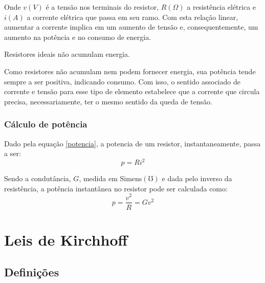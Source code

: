 \documentclass[12pt,fleqn]{book} %
\begin{document}
     Onde $v (V)$ é a tensão nos terminais do resistor, $ R(\Omega)$ a resistência elétrica e $i (A)$ a corrente elétrica que passa em seu ramo. Com esta relação linear, aumentar a corrente implica em um aumento de tensão e, consequentemente, um aumento na potência e no consumo de energia.
     \begin{remark}
      Resistores ideais não acumulam energia.
     \end{remark}
     
      Como resistores não acumulam nem podem fornecer energia, sua potência tende sempre a ser positiva, indicando consumo. Com isso, o sentido associado de corrente e tensão para esse tipo de elemento estabelece que a corrente que circula precisa, necessariamente, ter o mesmo sentido da queda de tensão.     
         
         \subsection{Cálculo de potência}	   
	  
	  Dado pela equação \ref{potencia}, a potencia de um resistor, instantaneamente, passa a ser:
	  \begin{equation}
	  p = Ri^2
	  \end{equation}
	  
	  Sendo a condutância, $G$, medida em Simens$(\mho)$ e dada pelo inverso da resistência, a potência instantânea no resistor pode ser calculada como:
	  \begin{equation}
	  p = \frac{v^2}{R} = Gv^2
	  \end{equation}
	  
	  
	
\chapter{Leis de Kirchhoff}
    
    \section{Definições}
        
\end{document}
